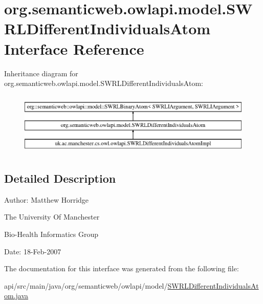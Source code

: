 \hypertarget{interfaceorg_1_1semanticweb_1_1owlapi_1_1model_1_1_s_w_r_l_different_individuals_atom}{\section{org.\-semanticweb.\-owlapi.\-model.\-S\-W\-R\-L\-Different\-Individuals\-Atom Interface Reference}
\label{interfaceorg_1_1semanticweb_1_1owlapi_1_1model_1_1_s_w_r_l_different_individuals_atom}
}
Inheritance diagram for org.\-semanticweb.\-owlapi.\-model.\-S\-W\-R\-L\-Different\-Individuals\-Atom\-:\begin{figure}[H]
\begin{center}
\leavevmode
\includegraphics[height=3.000000cm]{interfaceorg_1_1semanticweb_1_1owlapi_1_1model_1_1_s_w_r_l_different_individuals_atom}
\end{center}
\end{figure}


\subsection{Detailed Description}
Author\-: Matthew Horridge\par
 The University Of Manchester\par
 Bio-\/\-Health Informatics Group\par
 Date\-: 18-\/\-Feb-\/2007\par
\par
 

The documentation for this interface was generated from the following file\-:\begin{DoxyCompactItemize}
\item 
api/src/main/java/org/semanticweb/owlapi/model/\hyperlink{_s_w_r_l_different_individuals_atom_8java}{S\-W\-R\-L\-Different\-Individuals\-Atom.\-java}\end{DoxyCompactItemize}
